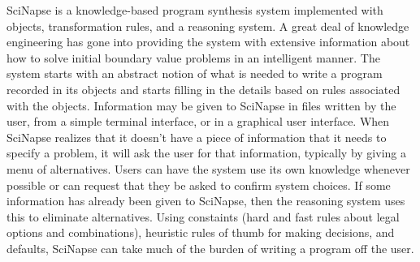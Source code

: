 SciNapse is a knowledge-based program synthesis system implemented with objects,
transformation rules, and a reasoning system. A great deal of knowledge engineering has gone into
providing the system with extensive information about how to solve initial boundary value
problems in an intelligent manner. The system starts with an abstract notion of what is needed to
write a program recorded in its objects and starts filling in the details based on rules associated
with the objects. Information may be given to SciNapse in files written by the user, from a simple
terminal interface, or in a graphical user interface. When SciNapse realizes that it doesn't have a
piece of information that it needs to specify a problem, it will ask the user for that information,
typically by giving a menu of alternatives. Users can have the system use its own knowledge
whenever possible or can request that they be asked to confirm system choices. If some
information has already been given to SciNapse, then the reasoning system uses this to eliminate
alternatives. Using constaints (hard and fast rules about legal options and combinations), heuristic
rules of thumb for making decisions, and defaults, SciNapse can take much of the burden of
writing a program off the user. 

